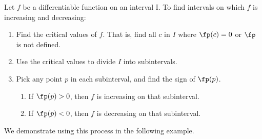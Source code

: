 {Let $f$ be a differentiable function on an interval I. To find intervals on which $f$ is increasing and decreasing:
\begin{enumerate}
\item	Find the critical values of $f$. That is, find all $c$ in $I$ where $\fp(c) = 0$ or $\fp$ is not defined.
\item		Use the critical values to divide $I$ into subintervals.
\item		Pick any point $p$ in each subinterval, and find the sign of $\fp(p)$. 
		\begin{enumerate}
		\item		If $\fp(p)>0$, then $f$ is increasing on that subinterval.
		\item		If $\fp(p)<0$, then $f$ is decreasing on that subinterval.
		\end{enumerate}
\end{enumerate}
}

We demonstrate using this process in the following example.\\


